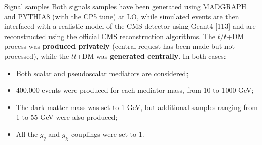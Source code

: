 \documentclass[8pt]{beamer}
\begin{document}
\begin{frame}{Signal samples}
\justifying
Both signals samples have been generated using MADGRAPH and PYTHIA8 (with the CP5 tune) at LO, while simulated events are then interfaced with a realistic model of the CMS detector using Geant4 [113] and are reconstructed using the official CMS reconstruction algorithms. \vfill
The $t/\bar t$+DM process was \textbf{produced privately} (central request has been made but not processed), while the $t \bar t$+DM was \textbf{generated centrally}. In both cases:

\begin{itemize}
\item Both scalar and pseudoscalar mediators are considered;
\item 400.000 events were produced for each mediator mass, from 10 to 1000 GeV;
\item The dark matter mass was set to 1 GeV, but additional samples ranging from 1 to 55 GeV were also produced;
\item All the $g_q$ and $g_\chi$ couplings were set to 1.
\end{itemize} \vfill
\end{frame}
\end{document}
